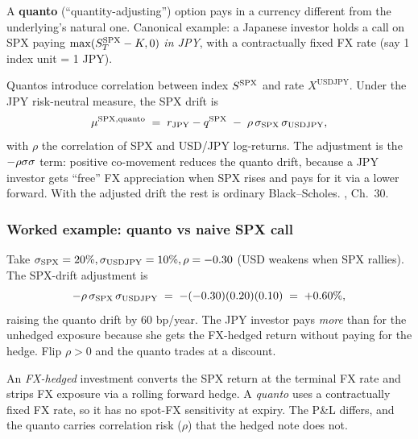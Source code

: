 A \textbf{quanto} (``quantity-adjusting'') option pays in a currency
different from the underlying's natural one.  Canonical example: a
Japanese investor holds a call on SPX paying
$\max(S_T^{\mathrm{SPX}} - K, 0)$ \emph{in JPY}, with a
contractually fixed FX rate (say 1 index unit = 1 JPY).

Quantos introduce correlation between index $S^{\mathrm{SPX}}$
and rate $X^{\mathrm{USDJPY}}$.  Under the JPY risk-neutral measure,
the SPX drift is
\begin{equation}
  \mu^{\mathrm{SPX, quanto}} \;=\;
  r_{\mathrm{JPY}} - q^{\mathrm{SPX}}
  \;-\; \rho \, \sigma_{\mathrm{SPX}} \, \sigma_{\mathrm{USDJPY}},
  \label{eq:quanto_drift}
\end{equation}
with $\rho$ the correlation of SPX and USD/JPY log-returns.  The
adjustment is the $-\rho\sigma\sigma$ term: positive co-movement
reduces the quanto drift, because a JPY investor gets ``free'' FX
appreciation when SPX rises and pays for it via a lower forward.
With the adjusted drift the rest is ordinary Black--Scholes.
\citeHull, Ch.\ 30.

\subsubsection{Worked example: quanto vs naive SPX call}

Take $\sigma_{\mathrm{SPX}} = 20\%,
\sigma_{\mathrm{USDJPY}} = 10\%, \rho = -0.30$ (USD weakens when
SPX rallies).  The SPX-drift adjustment is
\begin{equation}
  -\rho\,\sigma_{\mathrm{SPX}}\,\sigma_{\mathrm{USDJPY}}
  \;=\;
  -(-0.30)(0.20)(0.10) \;=\; +0.60\%,
\end{equation}
raising the quanto drift by 60 bp/year.  The JPY investor pays
\emph{more} than for the unhedged exposure because she gets the
FX-hedged return without paying for the hedge.  Flip $\rho > 0$ and
the quanto trades at a discount.

\begin{pitfallbox}
An \emph{FX-hedged} investment converts the SPX return at the
terminal FX rate and strips FX exposure via a rolling forward hedge.
A \emph{quanto} uses a contractually fixed FX rate, so it has no
spot-FX sensitivity at expiry.  The P\&L differs, and the quanto carries
correlation risk ($\rho$) that the hedged note does not.
\end{pitfallbox}


